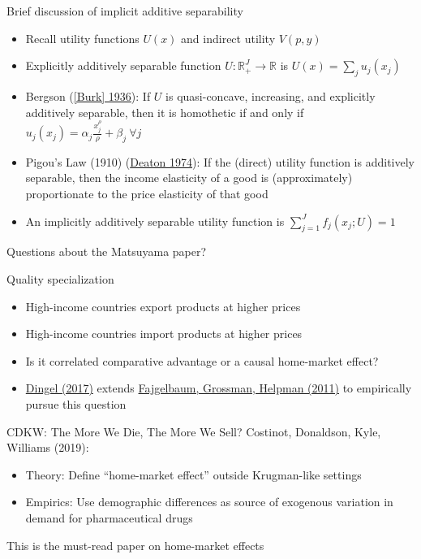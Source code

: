 \documentclass[10pt,notes=hide]{beamer}
\begin{document}
\begin{frame}{Brief discussion of implicit additive separability}
\begin{itemize}
	\item Recall utility functions $U(x)$ and indirect utility $V(p,y)$
	\item Explicitly additively separable function $U: \mathbb{R}_{+}^{J} \to \mathbb{R}$ is $U(x) = \sum_j u_j(x_j)$
	\item Bergson (\href{https://www.jstor.org/stable/2967658}{[Burk] 1936}): If $U$ is quasi-concave, increasing, and explicitly additively separable,
	then it is homothetic if and only if
	$u_j(x_j) = \alpha_j \frac{x_j^{\rho}}{\rho} + \beta_j \ \forall j$
	\item Pigou's Law (1910) (\href{https://www.jstor.org/stable/2231258}{Deaton 1974}): If the (direct) utility function is additively separable, then the income elasticity of a good is (approximately) proportionate to the price elasticity of that good
	\item An implicitly additively separable utility function is
	$\sum_{j=1}^{J} f_j\left(x_j; U\right)=1$
\end{itemize}
Questions about the Matsuyama paper?
\end{frame}
\begin{frame}{Quality specialization}
\begin{itemize}
	\item High-income countries export products at higher prices
	\item High-income countries import products at higher prices
	\item Is it correlated comparative advantage or a causal home-market effect?
	\item \href{https://academic.oup.com/restud/article/84/4/1551/2684498}{Dingel (2017)} extends \href{http://www.journals.uchicago.edu/doi/abs/10.1086/662628}{Fajgelbaum, Grossman, Helpman (2011)} to empirically pursue this question
\end{itemize}
\end{frame}
\begin{frame}{CDKW: The More We Die, The More We Sell?}
Costinot, Donaldson, Kyle, Williams (2019):
\begin{itemize}
	\item Theory: Define ``home-market effect'' outside Krugman-like settings
	\item Empirics: Use demographic differences as source of exogenous variation in demand for pharmaceutical drugs
\end{itemize}
This is the must-read paper on home-market effects
\end{frame}
\end{document}
